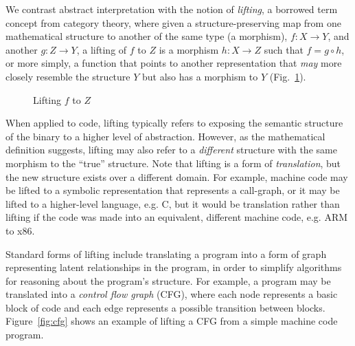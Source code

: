 We contrast abstract interpretation with the notion of \emph{lifting}, a borrowed term concept from category theory, where given a structure-preserving map from one mathematical structure to another of the same type (a morphism), $f: X \rightarrow Y$,  and another $g: Z \rightarrow Y$, a lifting of $f$ to $Z$ is a morphism $h: X \rightarrow Z$ such that $f = g \circ h$, or more simply, a function that points to another representation that \emph{may} more closely resemble the structure $Y$ but also has a morphism to $Y$ (Fig.~\ref{fig:lift}).

\begin{figure}[h]
\centering
{}
\caption{Lifting $f$ to $Z$}
\label{fig:lift}
\end{figure}

When applied to code, lifting typically refers to exposing the semantic structure of the binary to a higher level of abstraction.
However, as the mathematical definition suggests, lifting may also refer to a \emph{different} structure with the same morphism to the ``true'' structure.
Note that lifting is a form of \emph{translation}, but the new structure exists over a different domain.
For example, machine code may be lifted to a symbolic representation that represents a call-graph, or it may be lifted to a higher-level language, e.g. C, but it would be translation rather than lifting if the code was made into an equivalent, different machine code, e.g. ARM to x86.

Standard forms of lifting include translating a program into a form of graph representing latent relationships in the program, in order to simplify algorithms for reasoning about the program's structure.
For example, a program may be translated into a \emph{control flow graph} (CFG), where each node represents a basic block of code and each edge represents a possible transition between blocks.
Figure~\ref{fig:cfg} shows an example of lifting a CFG from a simple machine code program.

